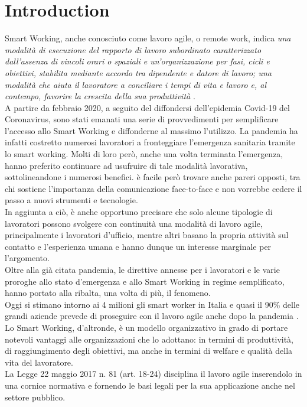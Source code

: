 \documentclass[12pt,journal,compsoc]{IEEEtran}
\begin{document}
\section{Introduction}
 Smart Working, anche conosciuto come lavoro agile, o remote work, indica \textit{una modalità di esecuzione del rapporto di lavoro subordinato caratterizzato dall'assenza di vincoli orari o spaziali e un'organizzazione per fasi, cicli e obiettivi, stabilita mediante accordo tra dipendente e datore di lavoro; una modalità che aiuta il lavoratore a conciliare i tempi di vita e lavoro e, al contempo, favorire la crescita della sua produttività} \cite{MIUR}.\\
A partire da febbraio 2020, a seguito del diffondersi dell’epidemia Covid-19 del Coronavirus, sono stati emanati una serie di provvedimenti per semplificare l’accesso allo Smart Working e diffonderne al massimo l’utilizzo. La pandemia ha infatti costretto numerosi lavoratori a fronteggiare l'emergenza sanitaria tramite lo smart working. Molti di loro però, anche una volta terminata l'emergenza, hanno preferito continuare ad usufruire di tale modalità lavorativa, sottolineandone i numerosi benefici. è facile però trovare anche pareri opposti, tra chi sostiene l'importanza della comunicazione face-to-face e non vorrebbe cedere il passo a nuovi strumenti e tecnologie.\\
In aggiunta a ciò, è anche opportuno precisare che solo alcune tipologie di lavoratori possono svolgere con continuità una modalità di lavoro agile, principalmente i lavoratori d'ufficio, mentre altri basano la propria attività sul contatto e l'esperienza umana e hanno dunque un interesse marginale per l'argomento.\\
Oltre alla già citata pandemia, le direttive annesse per i lavoratori e le varie proroghe allo stato d'emergenza e allo Smart Working in regime semplificato, hanno portato alla ribalta, una volta di più, il fenomeno.\\
Oggi si stimano intorno ai 4 milioni gli smart worker in Italia e quasi il 90\% delle grandi aziende prevede di proseguire con il lavoro agile anche dopo la pandemia \cite{Osservatori}. Lo Smart Working, d'altronde, è un modello organizzativo in grado di portare notevoli vantaggi alle organizzazioni che lo adottano: in termini di produttività, di raggiungimento degli obiettivi, ma anche in termini di welfare e qualità della vita del lavoratore.\\


La Legge 22 maggio 2017 n. 81 (art. 18-24) \cite{Gazzetta} disciplina il lavoro agile inserendolo in una cornice normativa e fornendo le basi legali per la sua applicazione anche nel settore pubblico.\\
\end{document}
